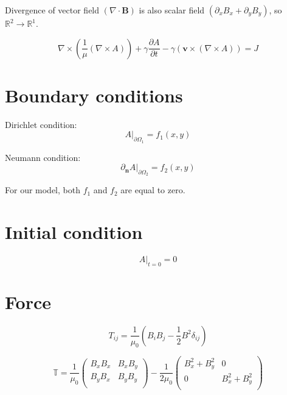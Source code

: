 Divergence of vector field $\left(\nabla \cdot \bm{B}\right)$ is also scalar field $\left(\partial_x B_x + \partial_y B_y\right)$, so $\mathbb{R}^2 \rightarrow \mathbb{R}^1$.

\begin{equation} \label{eq:7}
\nabla \times \left( \frac{1}{\mu} \left( \nabla \times A \right) \right) + \gamma \frac{\partial A}{\partial t} - \gamma \left( \bm{v} \times \left( \nabla \times A \right) \right) = J
\end{equation}

\section{Boundary conditions}
\noindent Dirichlet condition:
\begin{equation} \label{eq:6} 
A\bigg\rvert_{\partial \Omega_1} = f_1\left(x,y\right)
\end{equation}

\noindent Neumann condition:
\begin{equation} \label{eq:7} 
\partial_{\bm{n}} A\bigg\rvert_{\partial \Omega_2} = f_2\left(x,y\right)
\end{equation}

\noindent For our model, both $f_1$ and $f_2$ are equal to zero.

\section{Initial condition}

\begin{equation} \label{eq:10} 
A\bigg\rvert_{t=0} = 0
\end{equation}

\section{Force}

\begin{equation} \label{eq:11} 
T_{ij} = \frac{1}{\mu_0} \left(B_i B_j - \frac{1}{2} B^2 \delta_{ij}\right)
\end{equation}

\begin{equation} \label{eq:12} 
\mathbb{T} = \frac{1}{\mu_0} \begin{pmatrix}
B_x B_x & B_x B_y \\
B_y B_x & B_y B_y \\
\end{pmatrix} - \frac{1}{2\mu_0} \begin{pmatrix}
B_x^2 + B_y^2 & 0 \\
0 & B_x^2 + B_y^2 \\
\end{pmatrix}
\end{equation}

